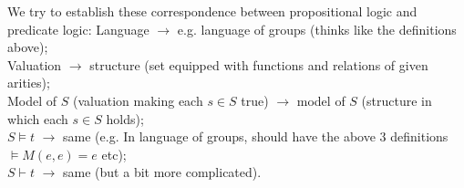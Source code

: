 \documentclass[a4paper]{article}
\begin{document}
We try to establish these correspondence between propositional logic and predicate logic:
Language $\to$ e.g. language of groups (thinks like the definitions above);\\
Valuation $\to$ structure (set equipped with functions and relations of given arities);\\
Model of $S$ (valuation making each $s \in S$ true) $\to$ model of $S$ (structure in which each $s \in S$ holds);\\
$S \vDash t$ $\to $ same (e.g. In language of groups, should have the above 3 definitions $\vDash M(e,e) = e$ etc);\\
$S \vdash t$ $\to $ same (but a bit more complicated).

\iffalse
\begin{equation*}
\begin{aligned}

\end{aligned}
\end{equation*}
\fi
\end{document}
